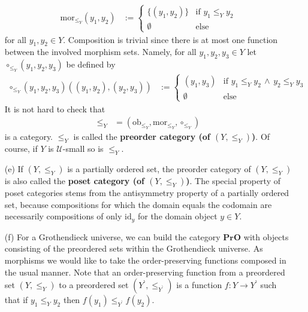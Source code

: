 \begin{exa}
\begin{enumerate}
\begin{align*}
  \mathrm{mor}_{\pmb{\leq}_{Y}}(y_{1},y_{2})
  &:=
  \begin{cases}
    \lbrace (y_{1},y_{2}) \rbrace
    &
    \text{if }
    y_{1}
    \leq_{Y}
    y_{2}
    \\
    \emptyset
    &
    \text{else}
  \end{cases}
\end{align*}
for all $y_{1},y_{2} \in Y$.
Composition is trivial since there is at most one function between the involved morphism sets.
Namely, for all $y_{1},y_{2},y_{3} \in Y$ let $\circ_{\pmb{\leq}_{Y}}(y_{1},y_{2},y_{3})$ be defined by
\begin{align*}
  \circ_{\pmb{\leq}_{Y}}(y_{1},y_{2},y_{3})
  \left(
    (y_{1},y_{2}),
    (y_{2},y_{3})
  \right)
  &:=
  \begin{cases}
    (y_{1},y_{3})
    &
    \text{if }
    y_{1}
    \leq_{Y}
    y_{2}
    \,
    \land
    \,
    y_{2}
    \leq_{Y}
    y_{3}
    \\
    \emptyset
    &
    \text{else}
  \end{cases}
\end{align*}
It is not hard to check that
\begin{align*}
  \pmb{\leq}_{Y}
  &=
  \left(
    \mathrm{ob}_{\pmb{\leq}_{Y}},
    \mathrm{mor}_{\pmb{\leq}_{Y}},
    \circ_{\pmb{\leq}_{Y}}
  \right)
\end{align*}
is a category.
$\pmb{\leq}_{Y}$ is called the \textbf{preorder category (of $(Y,\leq_{Y})$)}.
Of course, if $Y$ is $\mathcal{U}$-small so is $\pmb{\leq}_{Y}$.
\item[(e)]
If $(Y,\leq_{Y})$ is a partially ordered set, the preorder category of $(Y,\leq_{Y})$ is also called the \textbf{poset category (of $(Y,\leq_{Y})$)}.
The special property of poset categories stems from the antisymmetry property of a partially ordered set, because compositions for which the domain equals the codomain are necessarily compositions of only $\mathrm{id}_{y}$ for the domain object $y \in Y$.
\item[(f)]
For a Grothendieck universe, we can build the category $\mathbf{PrO}$ with objects consisting of the preordered sets within the Grothendieck universe.
As morphisms we would like to take the order-preserving functions composed in the usual manner.
Note that an order-preserving function from a preordered set $(Y,\leq_{Y})$ to a preordered set $(Y^{\backprime},\leq_{Y^{\backprime}})$ is a function $f \colon Y \rightarrow Y^{\backprime}$ such that if $y_{1} \leq_{Y} y_{2}$ then $f(y_{1}) \leq_{Y^{\backprime}} f(y_{2})$.

\end{enumerate}
\end{exa}
